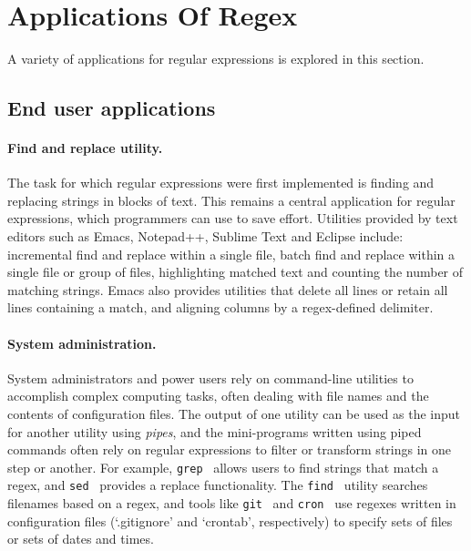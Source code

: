 \section{Applications Of Regex}
\label{sec:applications}
A variety of applications for regular expressions is explored in this section.

\subsection{End user applications}
\paragraph{Find and replace utility.}  The task for which regular expressions were first implemented is finding and replacing strings in blocks of text.  This remains a central application for regular expressions, which programmers can use to save effort.  Utilities provided by text editors such as Emacs, Notepad++, Sublime Text and Eclipse include: incremental find and replace within a single file, batch find and replace within a single file or group of files, highlighting matched text and counting the number of matching strings.  Emacs also provides utilities that delete all lines or retain all lines containing a match, and aligning columns by a regex-defined delimiter.

\paragraph{System administration.}  System administrators and power users rely on command-line utilities to accomplish complex computing tasks, often dealing with file names and the contents of configuration files.  The output of one utility can be used as the input for another utility using \emph{pipes}, and the mini-programs written using piped commands often rely on regular expressions to filter or transform strings in one step or another.  For example, {\tt grep}~ allows users to find strings that match a regex, and {\tt sed}~ provides a replace functionality.  The {\tt find}~ utility searches filenames based on a regex, and tools like {\tt git}~ and {\tt cron}~ use regexes written in configuration files (`.gitignore' and `crontab', respectively) to specify sets of files or sets of dates and times.

